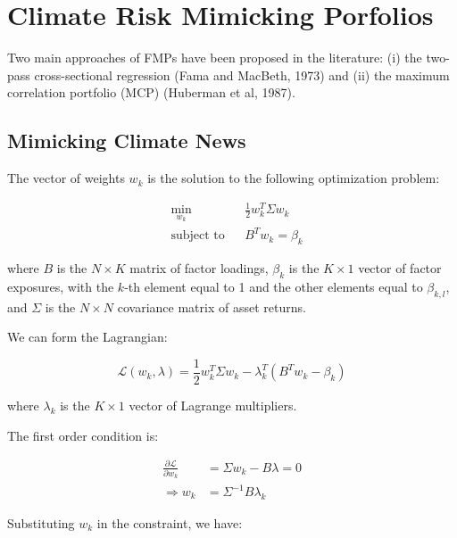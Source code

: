 \chapter{Climate Risk Mimicking Porfolios}
 
Two main approaches of FMPs 
have been proposed in the literature: 
(i) the two-pass cross-sectional regression (Fama and MacBeth, 1973) and
(ii) the maximum correlation portfolio (MCP) (Huberman et al, 1987).


\section{Mimicking Climate News}

The vector of weights $w_k$ 
is the solution to the following optimization problem:

\begin{equation}
    \begin{aligned}
        & \underset{w_k}{\min}
        & &  \frac{1}{2} w_k^T \Sigma w_k \\
        & \text{subject to}
        & & B^T w_k = \beta_k
    \end{aligned}
\end{equation}

where $B$ is the $N \times K$ matrix of factor loadings, $\beta_k$ is the $K \times 1$ vector of factor exposures,
with the $k$-th element equal to 1 and the other elements equal to $\beta_{k,l}$, 
and $\Sigma$ is the $N \times N$ covariance matrix of asset returns.

We can form the Lagrangian:

\begin{equation}
    \mathcal{L}(w_k, \lambda) = \frac{1}{2} w_k^T \Sigma w_k - \lambda_k^T (B^T w_k - \beta_k)
\end{equation}

where $\lambda_k$ is the $K \times 1$ vector of Lagrange multipliers.

The first order condition is:

\begin{equation}
    \begin{aligned}
        \frac{\partial \mathcal{L}}{\partial w_k} &= \Sigma w_k - B \lambda = 0 \\
        \Rightarrow w_k &= \Sigma^{-1} B \lambda_k
    \end{aligned}
\end{equation}

Substituting $w_k$ in the constraint, we have:

